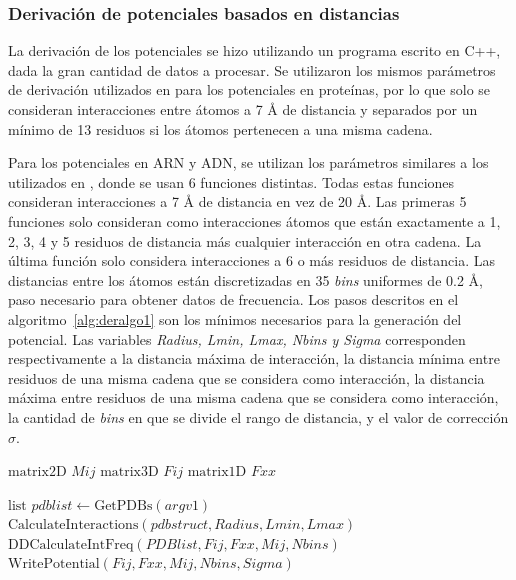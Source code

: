 \subsubsection{Derivación de potenciales basados en distancias}
\par
La derivación de los potenciales se hizo utilizando un programa escrito en C++, dada la gran cantidad de datos a procesar.
Se utilizaron los mismos parámetros de derivación utilizados en \cite{Melo1998} para los potenciales en proteínas, por lo que solo se consideran interacciones entre átomos a 7 \si{\angstrom} de distancia y separados por un mínimo de 13 residuos si los átomos pertenecen a una misma cadena.

\par
Para los potenciales en ARN y ADN, se utilizan los parámetros similares a los utilizados en \cite{Capriotti2011}, donde se usan 6 funciones distintas. Todas estas funciones consideran interacciones a 7 \si{\angstrom} de distancia en vez de 20 \si{\angstrom}.
Las primeras 5 funciones solo consideran como interacciones átomos que están exactamente a 1, 2, 3, 4 y 5 residuos de distancia más cualquier interacción en otra cadena. 
La última función solo considera interacciones a 6 o más residuos de distancia.
Las distancias entre los átomos están discretizadas en 35 \textit{bins} uniformes de 0.2 \si{\angstrom}, paso necesario para obtener datos de frecuencia.
Los pasos descritos en el algoritmo~\ref{alg:deralgo1} son los mínimos necesarios para la generación del potencial. 
Las variables \textit{Radius, Lmin, Lmax, Nbins y Sigma} corresponden respectivamente a la distancia máxima de interacción, la distancia mínima entre residuos de una misma cadena que se considera como interacción, la distancia máxima entre residuos de una misma cadena que se considera como interacción, la cantidad de \textit{bins} en que se divide el rango de distancia, y el valor de corrección $\sigma$.

\begin{algorithm}[H]
\caption{Pasos para la derivación de un potencial a partir de una lista de archivos PDB}\label{alg:deralgo1}
\begin{algorithmic}[1]
\State $ \text{matrix2D } Mij $ 
\State $ \text{matrix3D } Fij $ 
\State $ \text{matrix1D } Fxx $ 

\State $ \text{list } pdblist \gets \text{GetPDBs}(argv1) $ 
\State $ \text{CalculateInteractions}(pdbstruct,Radius,Lmin,Lmax) $ 
\EndFor
\State $ \text{DDCalculateIntFreq}(PDBlist,Fij,Fxx,Mij,Nbins) $ 
\State $ \text{WritePotential}(Fij,Fxx,Mij,Nbins,Sigma) $ 
\EndProcedure
\end{algorithmic}
\end{algorithm}

